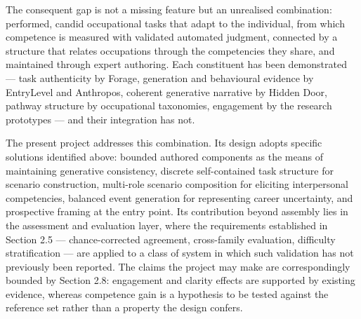 The consequent gap is not a missing feature but an unrealised combination: performed, candid occupational tasks that adapt to the individual, from which competence is measured with validated automated judgment, connected by a structure that relates occupations through the competencies they share, and maintained through expert authoring. Each constituent has been demonstrated --- task authenticity by Forage, generation and behavioural evidence by EntryLevel and Anthropos, coherent generative narrative by Hidden Door, pathway structure by occupational taxonomies, engagement by the research prototypes --- and their integration has not.

The present project addresses this combination. Its design adopts specific solutions identified above: bounded authored components as the means of maintaining generative consistency, discrete self-contained task structure for scenario construction, multi-role scenario composition for eliciting interpersonal competencies, balanced event generation for representing career uncertainty, and prospective framing at the entry point. Its contribution beyond assembly lies in the assessment and evaluation layer, where the requirements established in Section 2.5 --- chance-corrected agreement, cross-family evaluation, difficulty stratification --- are applied to a class of system in which such validation has not previously been reported. The claims the project may make are correspondingly bounded by Section 2.8: engagement and clarity effects are supported by existing evidence, whereas competence gain is a hypothesis to be tested against the reference set rather than a property the design confers.
